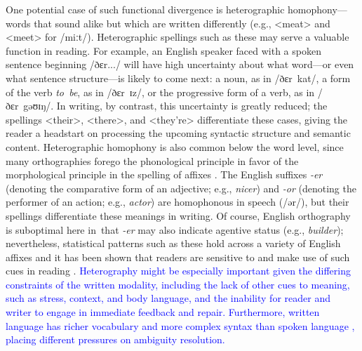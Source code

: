 \documentclass[doc,biblatex]{apa7}
\newcommand\newmaterial[1]{\textcolor{blue}{#1}}
\begin{document}
One potential case of such functional divergence is heterographic homophony---words that sound alike but which are written differently (e.g., <meat> and <meet> for /miːt/). Heterographic spellings such as these may serve a valuable function in reading. For example, an English speaker faced with a spoken sentence beginning /ðɛr.../ will have high uncertainty about what word---or even what sentence structure---is likely to come next: a noun, as in /ðɛr~kat/, a form of the verb \textit{to~be}, as in /ðɛr~ɪz/, or the progressive form of a verb, as in /ðɛr~gəʊɪŋ/. In writing, by contrast, this uncertainty is greatly reduced; the spellings <their>, <there>, and <they're> differentiate these cases, giving the reader a headstart on processing the upcoming syntactic structure and semantic content. Heterographic homophony is also common below the word level, since many orthographies forego the phonological principle in favor of the morphological principle in the spelling of affixes \parencite{Sandra:2024}. The English suffixes \textit{-er} (denoting the comparative form of an adjective; e.g., \textit{nicer}) and \textit{-or} (denoting the performer of an action; e.g., \textit{actor}) are homophonous in speech (/ər/), but their spellings differentiate these meanings in writing. Of course, English orthography is suboptimal here in~that \textit{-er} may also indicate agentive status (e.g., \textit{builder}); nevertheless, statistical patterns such as these hold across a variety of English affixes \parencite{Berg:2017} and it has been shown that readers are sensitive to and make use of such cues in reading \parencite{Ulicheva:2020}. \newmaterial{Heterography might be especially important given the differing constraints of the written modality, including the lack of other cues to meaning, such as stress, context, and body language, and the inability for reader and writer to engage in immediate feedback and repair. Furthermore, written language has richer vocabulary and more complex syntax than spoken language \parencite{Biber:1988, Korochkina:2024, Nation:2022}, placing different pressures on ambiguity resolution.}
\end{document}
